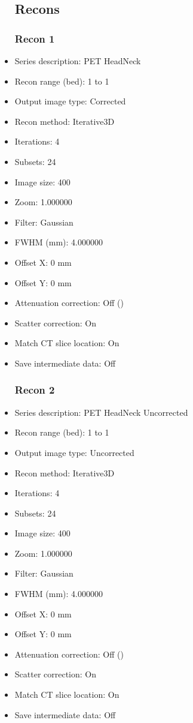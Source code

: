 \documentclass[12pt]{article}
\begin{document}
\begin{itemize}
\subsection{Recons}
\subsubsection{Recon 1}
\item Series description: PET HeadNeck
\item Recon range (bed): 1 to 1
\item Output image type: Corrected
\item Recon method: Iterative3D
\item Iterations: 4
\item Subsets: 24
\item Image size: 400
\item Zoom: 1.000000
\item Filter: Gaussian
\item FWHM (mm): 4.000000
\item Offset X: 0 mm
\item Offset Y: 0 mm
\item Attenuation correction: Off ()
\item Scatter correction: On
\item Match CT slice location: On
\item Save intermediate data: Off
\subsubsection{Recon 2}
\item Series description: PET HeadNeck Uncorrected
\item Recon range (bed): 1 to 1
\item Output image type: Uncorrected
\item Recon method: Iterative3D
\item Iterations: 4
\item Subsets: 24
\item Image size: 400
\item Zoom: 1.000000
\item Filter: Gaussian
\item FWHM (mm): 4.000000
\item Offset X: 0 mm
\item Offset Y: 0 mm
\item Attenuation correction: Off ()
\item Scatter correction: On
\item Match CT slice location: On
\item Save intermediate data: Off
\end{itemize}
\end{document}
